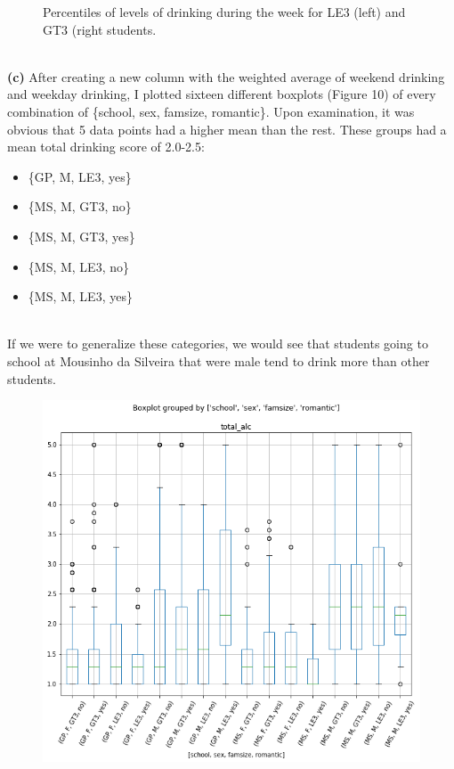 \documentclass[11pt]{article}
\begin{document}
\begin{figure}[h!]
\begin{subfigure}[b]{0.2\linewidth}
  \end{subfigure}
  \caption{Percentiles of levels of drinking during the week for LE3 (left) and GT3 (right students.}
  \label{fig:coffee}
\end{figure}
\\[25mm]
\textbf{(c)} After creating a new column with the weighted average of weekend drinking and weekday drinking, I plotted sixteen different boxplots (Figure 10) of every combination of \{school, sex, famsize, romantic\}. Upon examination, it was obvious that 5 data points had a higher mean than the rest. These groups had a mean total drinking score of 2.0-2.5:
\begin{itemize}
	\item \{GP, M, LE3, yes\}
	\item \{MS, M, GT3, no\}
	\item \{MS, M, GT3, yes\}
	\item \{MS, M, LE3, no\}
	\item \{MS, M, LE3, yes\}
\end{itemize}
\ \\
If we were to generalize these categories, we would see that students going to school at Mousinho da Silveira that were male tend to drink more than other students.
\begin{figure}
	\centering
	\includegraphics[width=\linewidth]{big_box.png}
	\caption{}
\end{figure}
\end{document}
